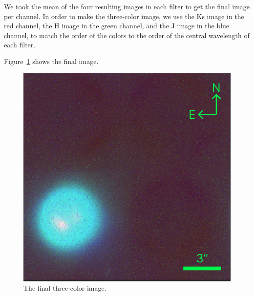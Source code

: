 \documentclass{article}
\begin{document}
    We took the mean of the four resulting images in each filter to get the final image per channel. In order to make the three-color image, we use the Ks image in the red channel, the H image in the green channel, and the J image in the blue channel, to match the order of the colors to the order of the central wavelength of each filter.

    Figure~\ref{fig:threecolor} shows the final image.

    \begin{figure}
        \centering
        \includegraphics[width=\textwidth]{neptune_final_sc.png}
        \caption{The final three-color image.}
        \label{fig:threecolor}
    \end{figure}

    {}
    
\end{document}

